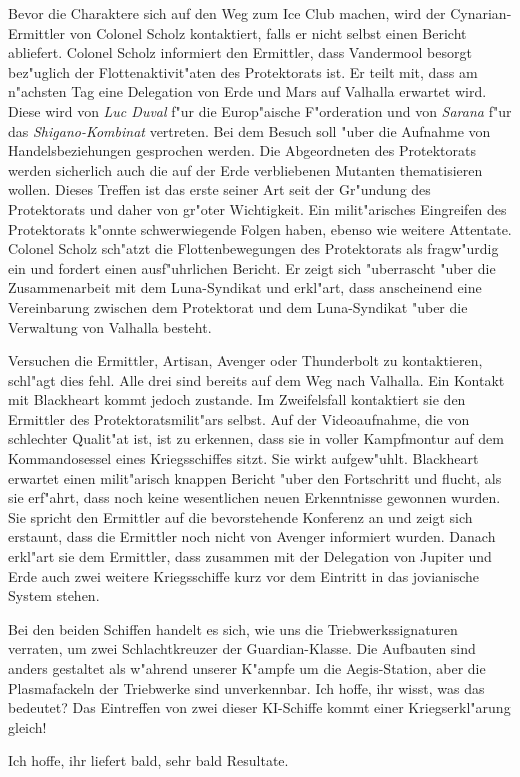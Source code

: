 Bevor die Charaktere sich auf den Weg zum Ice Club machen, wird der Cynarian-Ermittler von Colonel Scholz kontaktiert, falls er nicht selbst einen Bericht abliefert. Colonel Scholz informiert den Ermittler, dass Vandermool besorgt bez"uglich der Flottenaktivit"aten des Protektorats ist. Er teilt mit, dass am n"achsten Tag eine Delegation von Erde und Mars auf Valhalla erwartet wird. Diese wird von 
\emph{Luc Duval} f"ur die Europ"aische F"orderation und von \emph{Sarana} f"ur das \emph{Shigano-Kombinat} vertreten. Bei dem Besuch soll "uber die Aufnahme von Handelsbeziehungen gesprochen werden. Die Abgeordneten des Protektorats werden sicherlich auch die auf der Erde verbliebenen Mutanten thematisieren wollen. Dieses Treffen ist das erste seiner Art seit der Gr"undung des Protektorats und daher von gr"o\3ter Wichtigkeit. Ein milit"arisches Eingreifen des Protektorats k"onnte schwerwiegende Folgen haben, ebenso wie weitere Attentate. Colonel Scholz sch"atzt die Flottenbewegungen des Protektorats als fragw"urdig ein und fordert einen ausf"uhrlichen Bericht. Er zeigt sich "uberrascht "uber die Zusammenarbeit mit dem Luna-Syndikat und erkl"art, dass anscheinend eine Vereinbarung zwischen dem Protektorat und dem Luna-Syndikat "uber die Verwaltung von Valhalla besteht.


Versuchen die Ermittler, Artisan, Avenger oder Thunderbolt zu kontaktieren, schl"agt dies fehl. Alle drei sind bereits auf dem Weg nach Valhalla. Ein Kontakt mit Blackheart kommt jedoch zustande. Im Zweifelsfall kontaktiert sie den Ermittler des Protektoratsmilit"ars selbst. Auf der Videoaufnahme, die von schlechter Qualit"at ist, ist zu erkennen, dass sie in voller Kampfmontur auf dem Kommandosessel eines Kriegsschiffes sitzt. Sie wirkt aufgew"uhlt. Blackheart erwartet einen milit"arisch knappen Bericht "uber den Fortschritt und flucht, als sie erf"ahrt, dass noch keine wesentlichen neuen Erkenntnisse gewonnen wurden. Sie spricht den Ermittler auf die bevorstehende Konferenz an und zeigt sich erstaunt, dass die Ermittler noch nicht von Avenger informiert wurden. Danach erkl"art sie dem Ermittler, dass zusammen mit der Delegation von Jupiter und Erde auch zwei weitere Kriegsschiffe kurz vor dem Eintritt in das jovianische System stehen.

\begin{speech}
	Bei den beiden Schiffen handelt es sich, wie uns die Triebwerkssignaturen verraten, um zwei Schlachtkreuzer der Guardian-Klasse. Die Aufbauten sind anders gestaltet als w"ahrend unserer K"ampfe um die Aegis-Station, aber die Plasmafackeln der Triebwerke sind unverkennbar. Ich hoffe, ihr wisst, was das bedeutet? Das Eintreffen von zwei dieser KI-Schiffe kommt einer Kriegserkl"arung gleich!

	Ich hoffe, ihr liefert bald, sehr bald Resultate.
\end{speech}

